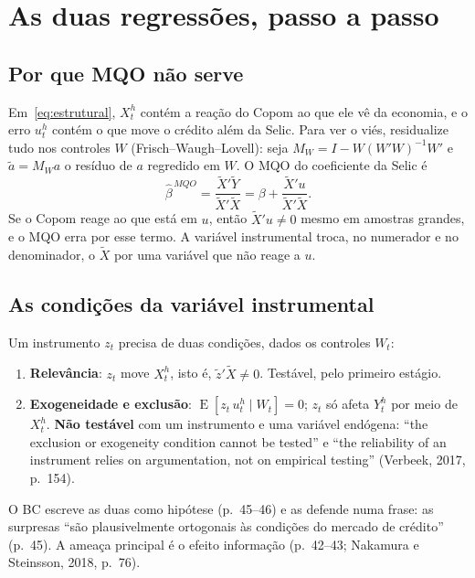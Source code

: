\section{As duas regressões, passo a passo}\label{sec:duas}

\subsection{Por que MQO não serve}
Em~\eqref{eq:estrutural}, $X^h_t$ contém a reação do Copom ao que ele vê da economia, e o erro
$u^h_t$ contém o que move o crédito além da Selic. Para ver o viés, residualize tudo nos controles
$W$ (Frisch--Waugh--Lovell): seja $M_W = I - W(W'W)^{-1}W'$ e $\tilde a = M_W a$ o resíduo de $a$
regredido em $W$. O MQO do coeficiente da Selic é
\begin{equation}\label{eq:mqo}
\hat\beta^{\,MQO} = \frac{\tilde X'\tilde Y}{\tilde X'\tilde X}
                  = \beta + \frac{\tilde X'u}{\tilde X'\tilde X}.
\end{equation}
Se o Copom reage ao que está em $u$, então $\tilde X'u \neq 0$ mesmo em amostras grandes, e o MQO
erra por esse termo. A variável instrumental troca, no numerador e no denominador, o $\tilde X$ por
uma variável que não reage a $u$.

\subsection{As condições da variável instrumental}
Um instrumento $z_t$ precisa de duas condições, dados os controles $W_t$:
\begin{enumerate}
  \item \textbf{Relevância}: $z_t$ move $X^h_t$, isto é, $\tilde z'\tilde X \neq 0$. Testável, pelo primeiro estágio.
  \item \textbf{Exogeneidade e exclusão}: $\operatorname{E}[z_t\,u^h_t\mid W_t]=0$; $z_t$ só afeta
        $Y^h_t$ por meio de $X^h_t$. \textbf{Não testável} com um instrumento e uma variável endógena:
        ``the exclusion or exogeneity condition cannot be tested'' e ``the reliability of an instrument
        relies on argumentation, not on empirical testing'' (Verbeek, 2017, p.~154).
\end{enumerate}
O BC escreve as duas como hipótese (p.~45--46) e as defende numa frase: as surpresas ``são
plausivelmente ortogonais às condições do mercado de crédito'' (p.~45). A ameaça principal é o efeito
informação (p.~42--43; Nakamura e Steinsson, 2018, p.~76).

